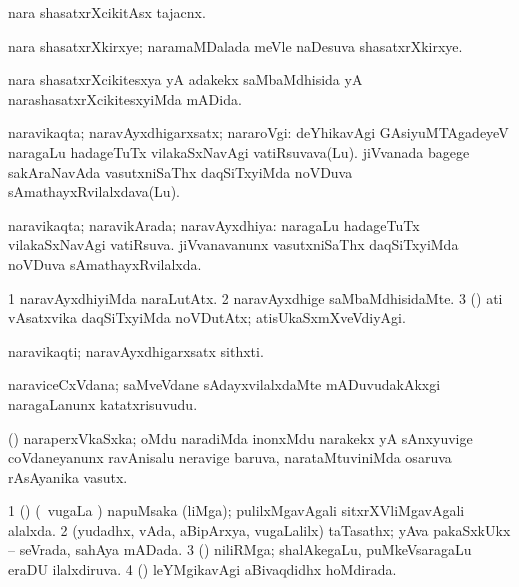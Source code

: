 \bentry
{}
\gl{\nA}
\bmng
nara shasatxrXcikitAsx tajacnx. 
\emng
\eentry

\bentry
{}
\gl{\nA}
\bmng
nara shasatxrXkirxye; naramaMDalada meVle naDesuva shasatxrXkirxye. 
\emng
\eentry

\bentry
{}
\gl{\gu}
\bmng
nara shasatxrXcikitesxya yA adakekx saMbaMdhisida yA narashasatxrXcikitesxyiMda mADida. 
\emng
\eentry

\bentry
{}
\gl{\nA}
\bmng
naravikaqta; naravAyxdhigarxsatx; nararoVgi: 
\banum
{} deYhikavAgi GAsiyuMTAgadeyeV naragaLu hadageTuTx vilakaSxNavAgi vatiRsuvava(Lu). 
 jiVvanada bagege sakAraNavAda vasutxniSaThx daqSiTxyiMda noVDuva sAmathayxRvilalxdava(Lu). 
\eanum
\emng
\eentry

\bentry
{}
\gl{\gu}
\bmng
naravikaqta; naravikArada; naravAyxdhiya: 
\banum
{} naragaLu hadageTuTx vilakaSxNavAgi vatiRsuva. 
 jiVvanavanunx vasutxniSaThx daqSiTxyiMda noVDuva sAmathayxRvilalxda. 
\eanum
\emng
\eentry

\bentry
{}
\gl{\kirxvi}
\bmng
\bnum
\num{1} naravAyxdhiyiMda naraLutAtx. 
\num{2} naravAyxdhige saMbaMdhisidaMte. 
\num{3} (\AmA) ati vAsatxvika daqSiTxyiMda noVDutAtx; atisUkaSxmXveVdiyAgi. 
\enum
\emng
\eentry

\bentry
{}
\gl{\nA}
\bmng
naravikaqti; naravAyxdhigarxsatx sithxti. 
\emng
\eentry

\bentry
{}
\gl{\nA}
\bmng
naraviceCxVdana; saMveVdane sAdayxvilalxdaMte mADuvudakAkxgi naragaLanunx katatxrisuvudu. 
\emng
\eentry

\bentry
{}
\gl{\nA}
\bmng
(\jiVra) naraperxVkaSxka; oMdu naradiMda inonxMdu narakekx yA sAnxyuvige coVdaneyanunx ravAnisalu neravige baruva, narataMtuviniMda osaruva rAsAyanika vasutx. 
\emng
\eentry

\bentry
{}
\gl{\gu}
\bmng
\bnum
\num{1} (\vAyx) (\nA\ \mo vugaLa \vi) napuMsaka (liMga); pulilxMgavAgali sitxrXVliMgavAgali alalxda. 
\num{2} (yudadhx, vAda, aBipArxya, \mo vugaLalilx) taTasathx; yAva pakaSxkUkx -- seVrada, sahAya mADada. 
\num{3} (\savi) niliRMga; shalAkegaLu, puMkeVsaragaLu eraDU ilalxdiruva. 
\num{4} (\kiVvi) leYMgikavAgi aBivaqdidhx hoMdirada. 
\enum
\emng

